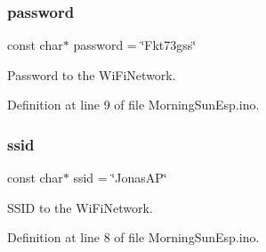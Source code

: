 \subsubsection{\texorpdfstring{password}{password}}
{\footnotesize\ttfamily const char$\ast$ password = \char`\"{}Fkt73gss\char`\"{}}



Password to the Wi\+Fi\+Network. 



Definition at line 9 of file Morning\+Sun\+Esp.\+ino.

\mbox{\label{_morning_sun_esp_8ino_a587ba0cb07f02913598610049a3bbb79}} 
\subsubsection{\texorpdfstring{ssid}{ssid}}
{\footnotesize\ttfamily const char$\ast$ ssid = \char`\"{}Jonas\+AP\char`\"{}}



S\+S\+ID to the Wi\+Fi\+Network. 



Definition at line 8 of file Morning\+Sun\+Esp.\+ino.

